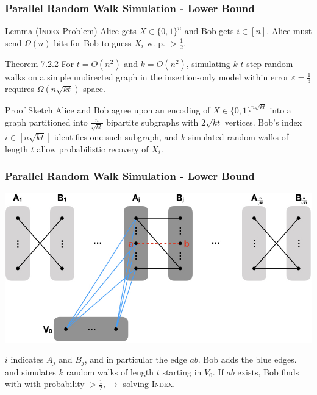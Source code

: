 \documentclass{beamer}
\newcommand{\algoname}[1]{\textnormal{\textsc{#1}}}
\begin{document}
\begin{frame}
\frametitle{Parallel Random Walk Simulation - Lower Bound}

\begin{block}{Lemma (\algoname{Index} Problem)}
Alice gets $X \in \{0,1\}^n$ and Bob gets $i \in [n]$.
Alice must send $\Omega(n)$ bits for Bob to guess $X_i$ w. p. $>\frac{1}{2}$.
\end{block}

\begin{block}{Theorem 7.2.2}
For $t = O(n^2)$ and $k = O(n^2)$, simulating $k$ $t$-step random walks on a simple undirected graph in the insertion-only model within error $\varepsilon = \frac{1}{3}$ requires $\Omega(n\sqrt{kt})$ space.
\end{block}

\begin{block}{Proof Sketch}
Alice and Bob agree upon an encoding of $X \in \{0,1\}^{n\sqrt{kt}}$ into a graph partitioned into $\frac{n}{\sqrt{kt}}$ bipartite subgraphs with $2\sqrt{kt}$ vertices.
Bob's index $i \in \left [ n\sqrt{kt} \right ]$ identifies one such subgraph, and $k$ simulated random walks of length $t$ allow probabilistic recovery of $X_i$.
\end{block}




\end{frame}




\begin{frame}
\frametitle{Parallel Random Walk Simulation - Lower Bound}


\centerline{\includegraphics[width=0.9\columnwidth]{lower_bound_proof}}

\begin{block}{}
	\begin{center}
		$i$ indicates $A_j$ and $B_j$, and in particular the edge $ab$.
		Bob adds the blue edges. and simulates $k$ random walks of length $t$ starting in $V_0$. 
		If $ab$ exists, Bob finds with with probability $> \frac{1}{2}, \rightarrow$ solving \algoname{Index}.
	\end{center}
\end{block}




\end{frame}
\end{document}
